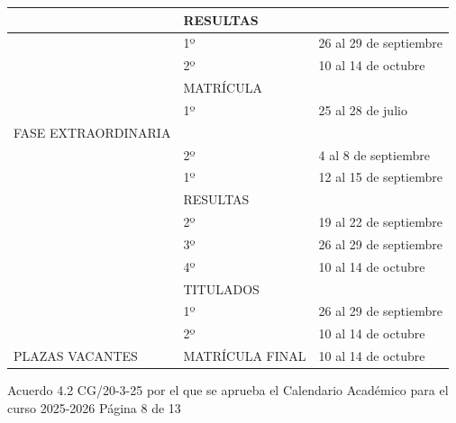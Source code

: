\documentclass{article}
\begin{document}
\begin{itemize}
\begin{itemize}
\begin{scriptsize}
\begin{table}[h!]
\begin{tabular}{|p{}|p{}|p{}|}
                                          & RESULTAS           &                          \\\hline
                                          & 1º                 & 26 al 29 de septiembre   \\\hline
                                          & 2º                 & 10 al 14 de octubre      \\\hline
                                          & MATRÍCULA          &                          \\\hline
                                          & 1º                 & 25 al 28 de julio        \\\hline
                      FASE EXTRAORDINARIA &                    &                          \\\hline
                                          & 2º                 & 4 al 8 de septiembre     \\\hline
                                          & 1º                 & 12 al 15 de septiembre   \\\hline
                                          & RESULTAS           &                          \\\hline
                                          & 2º                 & 19 al 22 de septiembre   \\\hline
                                          & 3º                 & 26 al 29 de septiembre   \\\hline
                                          & 4º                 & 10 al 14 de octubre      \\\hline
                                          & TITULADOS          &                          \\\hline
                                          & 1º                 & 26 al 29 de septiembre   \\\hline
                                          & 2º                 & 10 al 14 de octubre      \\\hline
                      PLAZAS VACANTES     & MATRÍCULA FINAL    & 10 al 14 de octubre      \\\hline
                    \end{tabular}\end{table}
                  \vspace{0.4cm}

                  Acuerdo 4.2 CG/20-3-25 por el que se aprueba el Calendario Académico para el curso 2025-2026  Página 8 de 13


\end{scriptsize}
\end{itemize}
\end{itemize}
\end{document}
